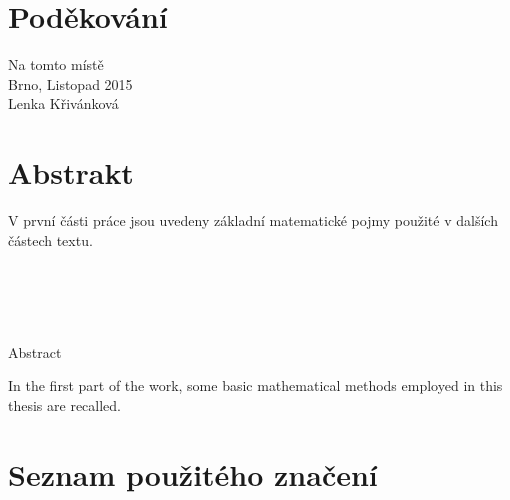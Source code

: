\documentclass[a4paper,12pt]{report}
\theoremstyle{definition} \newtheorem{definice}[veta]{Definice}
\theoremstyle{remark}
\begin{document}
\chapter*{Poděkování}
\pagestyle{plain}
Na tomto místě
\\

Brno, Listopad 2015
\\

Lenka Křivánková

\chapter*{Abstrakt}
V první části práce jsou uvedeny základní matematické pojmy použité v dalších částech textu. 
\\\\\\\\\\

\begin{flushright} {{\Huge Abstract}} \vspace{38pt} \end{flushright}
In the first part of the work, some basic mathematical methods employed in this thesis are recalled. 

\tableofcontents {}

\chapter*{Seznam použitého značení} 
\end{document}
